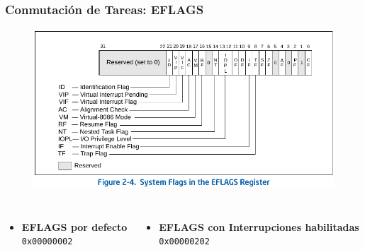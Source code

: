 \documentclass[aspectratio=169]{beamer}
\begin{document}
\begin{frame}
\frametitle{Conmutaci\'on de Tareas: EFLAGS}
    \vspace{-0.5cm}
    \begin{figure}[ht!]
    \centering
    \includegraphics[scale=0.8]{img/EFLAGS.pdf}
    \end{figure}
    \footnotesize
    \begin{columns}[c]
    \begin{itemize}
    \item[] \large \textbf{EFLAGS por defecto}\\ \textcolor{naranjauca}{\texttt{0x00000002}}
    \end{itemize}
    \begin{itemize}
    \item[] \large \textbf{EFLAGS con Interrupciones habilitadas}\\ \textcolor{naranjauca}{\texttt{0x00000202}}
    \end{itemize}
    \end{columns}
\end{frame}
\end{document}
